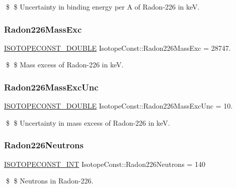 \$ \$ Uncertainty in binding energy per A of Radon-\/226 in keV. \mbox{\label{group___isotope_const-_radon-_rn226_ga070af57ea34f9cfc39f1338f606e1429}} 
\subsubsection{\texorpdfstring{Radon226\+Mass\+Exc}{Radon226MassExc}}
{\footnotesize\ttfamily \mbox{\hyperlink{group___isotope_const-_macros_ga8f45a7272ce02c0b4c65c44636ed719a}{I\+S\+O\+T\+O\+P\+E\+C\+O\+N\+S\+T\+\_\+\+D\+O\+U\+B\+LE}} Isotope\+Const\+::\+Radon226\+Mass\+Exc = 28747.}

\$ \$ Mass excess of Radon-\/226 in keV. \mbox{\label{group___isotope_const-_radon-_rn226_ga07f10b22ff518a228389c014aef5d3e6}} 
\subsubsection{\texorpdfstring{Radon226\+Mass\+Exc\+Unc}{Radon226MassExcUnc}}
{\footnotesize\ttfamily \mbox{\hyperlink{group___isotope_const-_macros_ga8f45a7272ce02c0b4c65c44636ed719a}{I\+S\+O\+T\+O\+P\+E\+C\+O\+N\+S\+T\+\_\+\+D\+O\+U\+B\+LE}} Isotope\+Const\+::\+Radon226\+Mass\+Exc\+Unc = 10.}

\$ \$ Uncertainty in mass excess of Radon-\/226 in keV. \mbox{\label{group___isotope_const-_radon-_rn226_ga2b2001ba406867ee3f6d08e0d77c288c}} 
\subsubsection{\texorpdfstring{Radon226\+Neutrons}{Radon226Neutrons}}
{\footnotesize\ttfamily \mbox{\hyperlink{group___isotope_const-_macros_ga5f18360b3e99483a35c32d789e62621c}{I\+S\+O\+T\+O\+P\+E\+C\+O\+N\+S\+T\+\_\+\+I\+NT}} Isotope\+Const\+::\+Radon226\+Neutrons = 140}

\$ \$ Neutrons in Radon-\/226. \mbox{\label{group___isotope_const-_radon-_rn226_ga4ff350f0af23a36ad06efe066edb8319}} 
